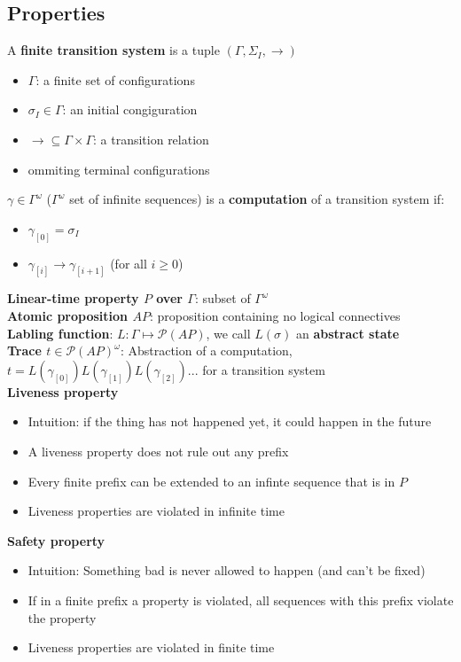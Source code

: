 \documentclass[11.5pt]{article}
\def\li{\rightarrow}
\def\P{\mathcal{P}}
\begin{document}
\subsection{Properties}
A \textbf{finite transition system} is a tuple $(\Gamma, \Sigma_I, \li)$
\begin{itemize}
    \item $\Gamma$: a finite set of configurations
    \item $\sigma_I\in \Gamma$: an initial congiguration
    \item $\li \subseteq \Gamma \times \Gamma$: a transition relation
    \item ommiting terminal configurations
\end{itemize} \smallskip
$\gamma \in \Gamma^\omega$ ($\Gamma^\omega$ set of infinite sequences) is a \textbf{computation} of a transition system if:
\begin{itemize}
    \item $\gamma_{[0]}=\sigma_I$
    \item $\gamma_{[i]} \li \gamma_{[i+1]}$ (for all $i \geq 0$)
\end{itemize} \smallskip
\textbf{Linear-time property $P$ over $\Gamma$}: subset of $\Gamma^\omega$ \smallskip \\
\textbf{Atomic proposition $AP$}: proposition containing no logical connectives \smallskip \\
\textbf{Labling function}: $L:\Gamma \mapsto \P(AP)$, we call $L(\sigma)$ an \textbf{abstract state} \smallskip \\
\textbf{Trace $t\in \P(AP)^\omega$}: Abstraction of a computation, $t = L(\gamma_{[0]})L(\gamma_{[1]})L(\gamma_{[2]})...$ for a transition system \smallskip \\
\textbf{Liveness property} \begin{itemize}
    \item Intuition: if the thing has not happened yet, it could happen in the future
    \item A liveness property does not rule out any prefix
    \item Every finite prefix can be extended to an infinte sequence that is in $P$
    \item Liveness properties are violated in infinite time
\end{itemize} \smallskip
\textbf{Safety property} \begin{itemize}
    \item Intuition: Something bad is never allowed to happen (and can't be fixed)
    \item If in a finite prefix a property is violated, all sequences with this prefix violate the property
    \item Liveness properties are violated in finite time
\end{itemize} \smallskip
\end{document}
